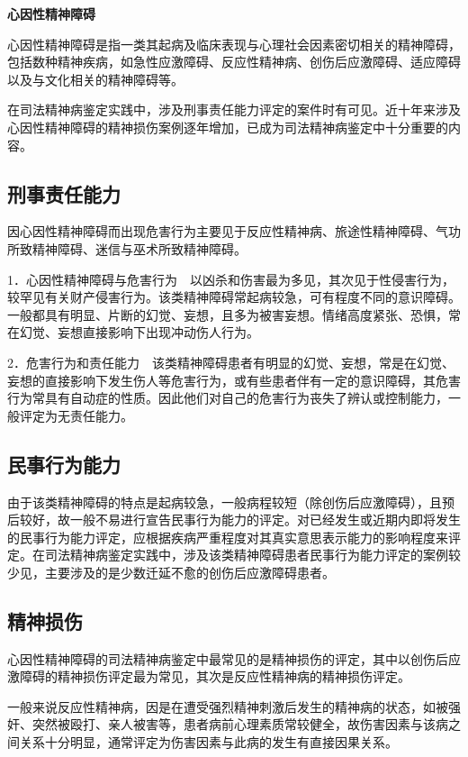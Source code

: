 \textbf{心因性精神障碍}

心因性精神障碍是指一类其起病及临床表现与心理社会因素密切相关的精神障碍，包括数种精神疾病，如急性应激障碍、反应性精神病、创伤后应激障碍、适应障碍以及与文化相关的精神障碍等。

在司法精神病鉴定实践中，涉及刑事责任能力评定的案件时有可见。近十年来涉及心因性精神障碍的精神损伤案例逐年增加，已成为司法精神病鉴定中十分重要的内容。

\subsection{刑事责任能力}

因心因性精神障碍而出现危害行为主要见于反应性精神病、旅途性精神障碍、气功所致精神障碍、迷信与巫术所致精神障碍。

1．心因性精神障碍与危害行为　以凶杀和伤害最为多见，其次见于性侵害行为，较罕见有关财产侵害行为。该类精神障碍常起病较急，可有程度不同的意识障碍。一般都具有明显、片断的幻觉、妄想，且多为被害妄想。情绪高度紧张、恐惧，常在幻觉、妄想直接影响下出现冲动伤人行为。

2．危害行为和责任能力　该类精神障碍患者有明显的幻觉、妄想，常是在幻觉、妄想的直接影响下发生伤人等危害行为，或有些患者伴有一定的意识障碍，其危害行为常具有自动症的性质。因此他们对自己的危害行为丧失了辨认或控制能力，一般评定为无责任能力。

\subsection{民事行为能力}

由于该类精神障碍的特点是起病较急，一般病程较短（除创伤后应激障碍），且预后较好，故一般不易进行宣告民事行为能力的评定。对已经发生或近期内即将发生的民事行为能力评定，应根据疾病严重程度对其真实意思表示能力的影响程度来评定。在司法精神病鉴定实践中，涉及该类精神障碍患者民事行为能力评定的案例较少见，主要涉及的是少数迁延不愈的创伤后应激障碍患者。

\subsection{精神损伤}

心因性精神障碍的司法精神病鉴定中最常见的是精神损伤的评定，其中以创伤后应激障碍的精神损伤评定最为常见，其次是反应性精神病的精神损伤评定。

一般来说反应性精神病，因是在遭受强烈精神刺激后发生的精神病的状态，如被强奸、突然被殴打、亲人被害等，患者病前心理素质常较健全，故伤害因素与该病之间关系十分明显，通常评定为伤害因素与此病的发生有直接因果关系。

